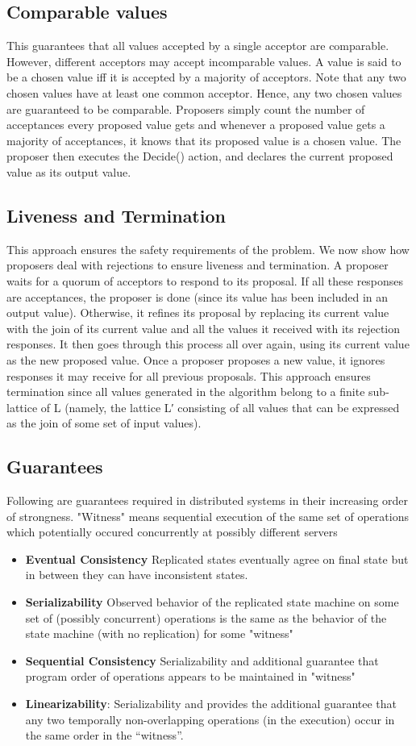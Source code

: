 \documentclass[a4paper,12pt]{report}
\begin{document}
\subsection*{Comparable values}
This guarantees that all values accepted by a single acceptor
 are comparable. However, different acceptors may
accept incomparable values. A value is said to be a chosen
value iff it is accepted by a majority of acceptors. Note that
any two chosen values have at least one common acceptor.
Hence, any two chosen values are guaranteed to be comparable. 
Proposers simply count the number of acceptances
every proposed value gets and whenever a proposed value
gets a majority of acceptances, it knows that its proposed
value is a chosen value. The proposer then executes the
Decide() action, and declares the current proposed value as
its output value.
\subsection*{Liveness and Termination}
This approach ensures the safety requirements of the problem.
 We now show how proposers deal with rejections to
ensure liveness and termination. A proposer waits for a
quorum of acceptors to respond to its proposal. If all these
responses are acceptances, the proposer is done (since its
value has been included in an output value). Otherwise, it
refines its proposal by replacing its current value with the
join of its current value and all the values it received with
its rejection responses. It then goes through this process all
over again, using its current value as the new proposed value.
Once a proposer proposes a new value, it ignores responses
it may receive for all previous proposals. This approach ensures
 termination since all values generated in the algorithm
belong to a finite sub-lattice of L (namely, the lattice L′ consisting of all values that can be expressed as the join of some
set of input values).
\subsection*{Guarantees}
Following are guarantees required in distributed systems in their increasing order of strongness.
"Witness" means sequential execution of the same set of operations which potentially occured concurrently at possibly different servers
\begin{itemize}
\item \textbf{Eventual Consistency} Replicated states eventually agree on final state but in between they can have inconsistent states.
\item \textbf{Serializability} Observed behavior of the replicated state machine on some
set of (possibly concurrent) operations is the same as the
behavior of the state machine (with no replication) for some "witness"
\item \textbf{Sequential Consistency} Serializability and additional guarantee that program order of operations appears to be maintained in "witness"
\item \textbf{Linearizability}: Serializability and  provides the additional guarantee
that any two temporally non-overlapping operations (in the
execution) occur in the same order in the “witness”.
\end{itemize}
\end{document}
